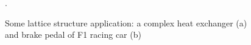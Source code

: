 \begin{figure}
    \centering
    \qquad
    \caption[Lattice structure applications.]{Some lattice structure application: a complex heat exchanger (a) and brake pedal of F1 racing car (b) \cite{milewski_additive_2017, du_plessis_beautiful_2019}}.
\end{figure}

